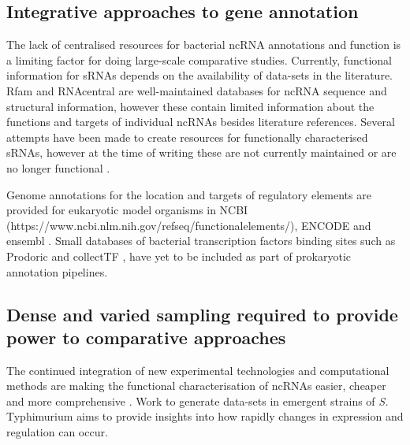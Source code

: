 

\subsection{Integrative approaches to gene annotation}

The lack of centralised resources for bacterial ncRNA annotations and function is a limiting factor for doing large-scale comparative studies. Currently, functional information for sRNAs depends on the availability of data-sets in the literature. Rfam \citep{Nawrocki2015-aatt} and RNAcentral \citep{The_RNAcentral_Consortium2019-lf} are well-maintained databases for ncRNA sequence and structural information, however these contain limited information about the functions and targets of individual ncRNAs besides literature references. Several attempts have been made to create resources for functionally characterised sRNAs, however at the time of writing these are not currently maintained \citep{Li2013-wl,Huang2009-kk} or are no longer functional \citep{Wang2016-ul,Pischimarov2012-za}.

Genome annotations for the location and targets of regulatory elements are provided for eukaryotic model organisms in NCBI (https://www.ncbi.nlm.nih.gov/refseq/functionalelements/), ENCODE \citep{ENCODE_Project_Consortium2012-qj} and ensembl \citep{Zerbino2015-fr,Zerbino2016-ak}. Small databases of bacterial transcription factors binding sites such as Prodoric \citep{Eckweiler2018-ay} and collectTF \citep{Kilic2014-md}, have yet to be included as part of prokaryotic annotation pipelines.

\subsection{Dense and varied sampling required to provide power to comparative approaches}

The continued integration of new experimental technologies and computational methods are making the functional characterisation of ncRNAs easier, cheaper and more comprehensive \citep{Georg2019-vl,Stav2019-mr}. Work to generate data-sets in emergent strains of \textit{S.} Typhimurium \citep{Canals2019-xxyv} aims to provide insights into how rapidly changes in expression and regulation can occur.

